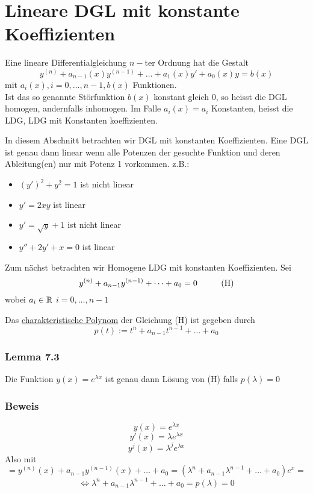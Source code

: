 \section{Lineare DGL mit konstante Koeffizienten} 

\begin{definition}{7.1}
Eine lineare Differentialgleichung $n-$ter Ordnung hat die Gestalt \[{y^{(n)}} + {a_{n - 1}}(x){y^{(n - 1)}} +  \ldots  + {a_1}(x)y' + {a_0}(x)y = b(x)\] mit $a_i(x),i=0,\dots,n-1, b(x)$ Funktionen. \\

Ist das so genannte Störfunktion $b(x)$ konstant gleich 0, so heisst die DGL homogen, andernfalls inhomogen. Im Falle $a_i(x)=a_i$ Konstanten, heisst die LDG, LDG mit Konstanten koeffizienten. 
\end{definition}

In diesem Abschnitt betrachten wir DGL mit konstanten Koeffizienten. Eine DGL ist genau dann linear wenn alle Potenzen der gesuchte Funktion und deren Ableitung(en) nur mit Potenz 1 vorkommen.
z.B.:
\begin{itemize}
\item $\left( y'\right)^2+y^2=1$ ist nicht linear
\item $y'=2xy$ ist linear
\item $y'=\sqrt{y}+1$ ist nicht linear
\item $y''+2y'+x=0$ ist linear
\end{itemize}

\noindent Zum nächst betrachten wir Homogene LDG mit konstanten Koeffizienten. Sei \[y^{(n)}+a_{n-1}y^{(n-1)}+\dots+a_0=0\text{\hspace{10mm}(H)}\] wobei $a_i\in\mathbb{R}$ $i=0,\dots,n-1$
\begin{definition}{7.2}
Das \underline{charakteristische Polynom} der Gleichung (H) ist gegeben durch \[p(t):=t^n+a_{n-1}t^{n-1}+\dots+a_0\]
\end{definition} 
\subsubsection*{Lemma 7.3}
Die Funktion $y(x)=e^{\lambda x}$ ist genau dann Lösung von (H) falls $p(\lambda)=0$ 
\subsubsection*{Beweis}
\[y(x)=e^{\lambda x}\]
\[y'(x)=\lambda e^{\lambda x}\]
\[y^j(x)=\lambda ^je^{\lambda x}\]
Also mit \[=y^{(n)}(x)+a_{n-1}y^{(n-1)}(x)+\dots+a_0=(\lambda ^n+a_{n-1}\lambda ^{n-1}+\dots +a_0)e^x=\]
\[\Leftrightarrow \lambda^n+a_{n-1}\lambda^{n-1}+\dots +a_0=p(\lambda)=0\]

